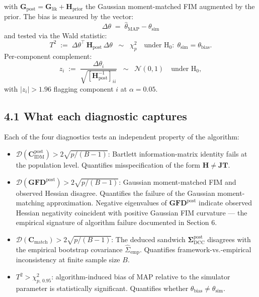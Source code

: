 \documentclass[11pt]{article}
\begin{document}
with $\mathbf G_{\mathrm{post}} = \mathbf G_{\mathrm{lik}} + \mathbf H_{\mathrm{prior}}$
the Gaussian moment-matched FIM augmented by the prior. The bias is
measured by the vector:
\begin{equation}
\Delta\theta
\;=\;
\widehat\theta_{\mathrm{MAP}} - \theta_{\mathrm{sim}}
\label{eq:av-bias-vector}
\end{equation}
and tested via the Wald statistic:
\begin{equation}
T^2
\;:=\;
\Delta\theta^\top\,\mathbf H_{\mathrm{post}}\,\Delta\theta
\;\;\sim\;\;
\chi^2_p
\quad\text{under H}_0:\;\theta_{\mathrm{sim}} = \theta_{\mathrm{bias}}.
\label{eq:av-Wald-T2}
\end{equation}
Per-component complement:
\begin{equation}
z_i
\;:=\;
\frac{\Delta\theta_i}{\sqrt{[\mathbf H_{\mathrm{post}}^{-1}]_{ii}}}
\;\;\sim\;\;
\mathcal N(0, 1)
\quad\text{under H}_0,
\label{eq:av-z-per-component}
\end{equation}
with $|z_i| > 1.96$ flagging component $i$ at $\alpha = 0.05$.

\subsection*{4.1 What each diagnostic captures}

Each of the four diagnostics tests an independent property of the
algorithm:

\begin{itemize}
\item $\mathcal D(\mathbf C_{\mathrm{IDM}}^{\mathrm{post}}) > 2\sqrt{p/(B-1)}$:
  Bartlett information-matrix identity fails at the population level.
  Quantifies misspecification of the form $\mathbf H \neq \mathbf{JT}$.
\item $\mathcal D(\mathbf{GFD}^{\mathrm{post}}) > 2\sqrt{p/(B-1)}$:
  Gaussian moment-matched FIM and observed Hessian disagree. Quantifies
  the failure of the Gaussian moment-matching approximation. Negative
  eigenvalues of $\mathbf{GFD}^{\mathrm{post}}$ indicate observed
  Hessian negativity coincident with positive Gaussian FIM curvature
  --- the empirical signature of algorithm failure documented in
  Section 6.
\item $\mathcal D(\mathbf C_{\mathrm{match}}) > 2\sqrt{p/(B-1)}$:
  The deduced sandwich $\boldsymbol\Sigma_{\mathrm{DCC}}^{\mathrm{post}}$
  disagrees with the empirical bootstrap covariance
  $\widehat\Sigma_{\mathrm{emp}}$. Quantifies framework-vs.-empirical
  inconsistency at finite sample size $B$.
\item $T^2 > \chi^2_{p,\,0.95}$: algorithm-induced bias of MAP relative
  to the simulator parameter is statistically significant. Quantifies
  whether $\theta_{\mathrm{bias}} \neq \theta_{\mathrm{sim}}$.
\end{itemize}
\end{document}
